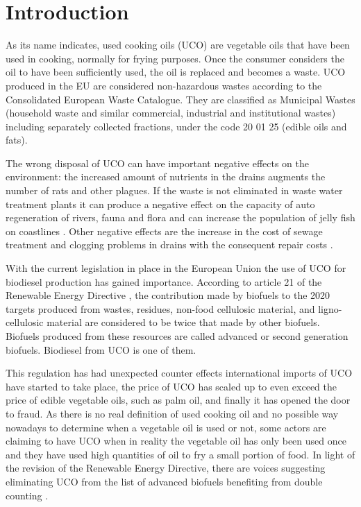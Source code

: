 \documentclass[sustainability,article,submit,moreauthors,pdftex,12pt,a4paper]{mdpi}
\begin{document}

\section{Introduction}

As its name indicates, used cooking oils (UCO) are vegetable oils that have been used in cooking, normally for frying purposes. Once the consumer considers the oil to have been sufficiently used, the oil is replaced and becomes a waste. UCO produced in the EU are considered non-hazardous wastes according to the Consolidated European Waste Catalogue. They are classified as Municipal Wastes (household waste and similar commercial, industrial and institutional wastes) including separately collected fractions, under the code 20 01 25 (edible oils and fats).

The wrong disposal of UCO can have important negative effects on the environment: the increased amount of nutrients in the drains augments the number of rats and other plagues. If the waste is not eliminated in waste water treatment plants it can produce a negative effect on the capacity of auto regeneration of rivers, fauna and flora and can increase the population of jelly fish on coastlines \cite{LifeECOBUS}. Other negative effects are the increase in the cost of sewage treatment and clogging problems in drains with the consequent repair costs \cite{LifeECOBUS}.

With the current legislation in place in the European Union the use of UCO for biodiesel production has gained importance. According to article 21 of the Renewable Energy Directive \cite{Directive2009/28/EC}, the contribution made by biofuels to the 2020 targets produced from wastes, residues, non-food cellulosic material, and ligno-cellulosic material are considered to be twice that made by other biofuels. Biofuels produced from these resources are called advanced or second generation biofuels. Biodiesel from UCO is one of them. 

This regulation has had unexpected counter effects \cite{Bailey2013,ePURE2013,EBTP2011} international imports of UCO have started to take place, the price of UCO has scaled up to even exceed the price of edible vegetable oils, such as palm oil, and finally it has opened the door to fraud. As there is no real definition of used cooking oil and no possible way nowadays to determine when a vegetable oil is used or not, some actors are claiming to have UCO when in reality the vegetable oil has only been used once and they have used high quantities of oil to fry a small portion of food. In light of the revision of the Renewable Energy Directive, there are voices suggesting eliminating UCO from the list of advanced biofuels benefiting from double counting \cite{ePURE2013}.
\end{document}
